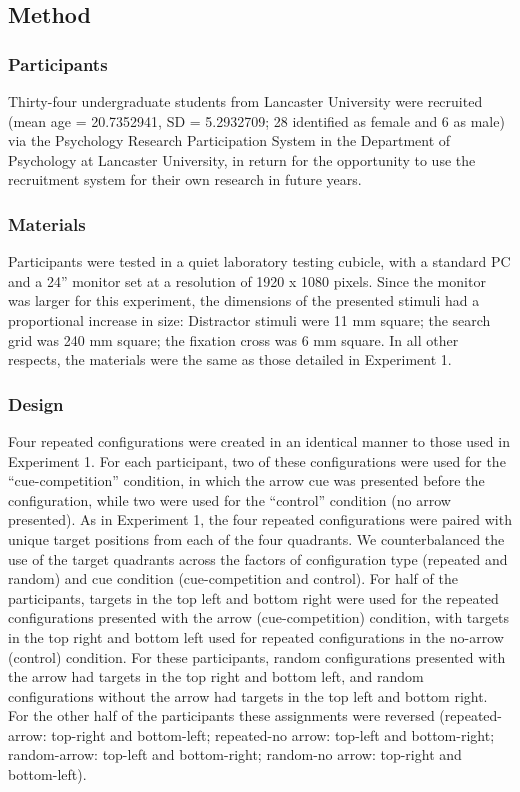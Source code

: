 \documentclass[
  man,
  floatsintext,
  longtable,
  nolmodern,
  notxfonts,
  notimes,
  colorlinks=true,linkcolor=blue,citecolor=blue,urlcolor=blue]{apa7}
\begin{document}
\subsection{Method}\label{method-1}

\subsubsection{Participants}\label{participants-1}

Thirty-four undergraduate students from Lancaster University were
recruited (mean age = 20.7352941, SD = 5.2932709; 28 identified as
female and 6 as male) via the Psychology Research Participation System
in the Department of Psychology at Lancaster University, in return for
the opportunity to use the recruitment system for their own research in
future years.

\subsubsection{Materials}\label{materials-1}

Participants were tested in a quiet laboratory testing cubicle, with a
standard PC and a 24'' monitor set at a resolution of 1920 x 1080
pixels. Since the monitor was larger for this experiment, the dimensions
of the presented stimuli had a proportional increase in size: Distractor
stimuli were 11 mm square; the search grid was 240 mm square; the
fixation cross was 6 mm square. In all other respects, the materials
were the same as those detailed in Experiment 1.

\subsubsection{Design}\label{design-1}

Four repeated configurations were created in an identical manner to
those used in Experiment 1. For each participant, two of these
configurations were used for the ``cue-competition'' condition, in which
the arrow cue was presented before the configuration, while two were
used for the ``control'' condition (no arrow presented). As in
Experiment 1, the four repeated configurations were paired with unique
target positions from each of the four quadrants. We counterbalanced the
use of the target quadrants across the factors of configuration type
(repeated and random) and cue condition (cue-competition and control).
For half of the participants, targets in the top left and bottom right
were used for the repeated configurations presented with the arrow
(cue-competition) condition, with targets in the top right and bottom
left used for repeated configurations in the no-arrow (control)
condition. For these participants, random configurations presented with
the arrow had targets in the top right and bottom left, and random
configurations without the arrow had targets in the top left and bottom
right. For the other half of the participants these assignments were
reversed (repeated-arrow: top-right and bottom-left; repeated-no arrow:
top-left and bottom-right; random-arrow: top-left and bottom-right;
random-no arrow: top-right and bottom-left).
\end{document}
